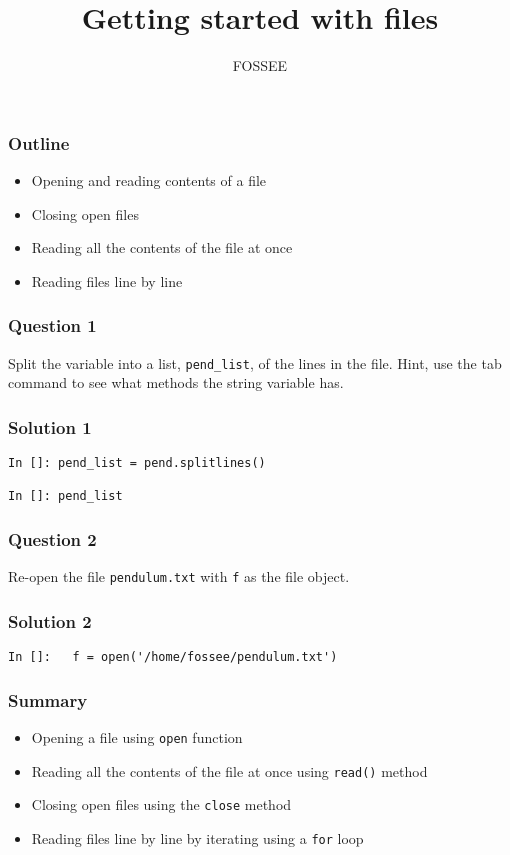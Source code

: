 \documentclass[presentation]{beamer}
\title{Getting started with files}
\author{FOSSEE}
\date{}
\begin{document}
\maketitle









\begin{frame}
\frametitle{Outline}
\label{sec-1}

\begin{itemize}
\item Opening and reading contents of a file
\item Closing open files
\item Reading all the contents of the file at once
\item Reading files line by line
\end{itemize}
\end{frame}
\begin{frame}
\frametitle{Question 1}
\label{sec-2}

  Split the variable into a list, \texttt{pend\_list}, of the lines in the
  file. Hint, use the tab command to see what methods the string
  variable has.
\end{frame}
\begin{frame}[fragile]
\frametitle{Solution 1}
\label{sec-3}

\begin{verbatim}
In []: pend_list = pend.splitlines()

In []: pend_list
\end{verbatim}
\end{frame}
\begin{frame}
\frametitle{Question 2}
\label{sec-4}

  Re-open the file \texttt{pendulum.txt} with \texttt{f} as the file object.
\end{frame}
\begin{frame}[fragile]
\frametitle{Solution 2}
\label{sec-5}

\begin{verbatim}
In []:   f = open('/home/fossee/pendulum.txt')
\end{verbatim}
\end{frame}
\begin{frame}
\frametitle{Summary}
\label{sec-6}

\begin{itemize}
\item Opening a file using \texttt{open} function
\item Reading all the contents of the file at once using \texttt{read()} method
\item Closing open files using the \texttt{close} method
\item Reading files line by line by iterating using a \texttt{for} loop
\end{itemize}
\end{frame}
\end{document}

